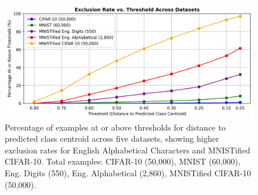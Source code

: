 \begin{figure}[ht!]
    \centering
    \includegraphics[width=0.99\columnwidth]{Figures/Exclusion_Rate_vs_Threshold.png}
    \caption{Percentage of examples at or above thresholds for distance to predicted class centroid across five datasets, showing higher exclusion rates for English Alphabetical Characters and MNISTified CIFAR-10. Total examples: CIFAR-10 (50,000), MNIST (60,000), Eng. Digits (550), Eng. Alphabetical (2,860), MNISTified CIFAR-10 (50,000).}
\label{fig:Exclusion_Rate_vs_Threshold}
\end{figure}

